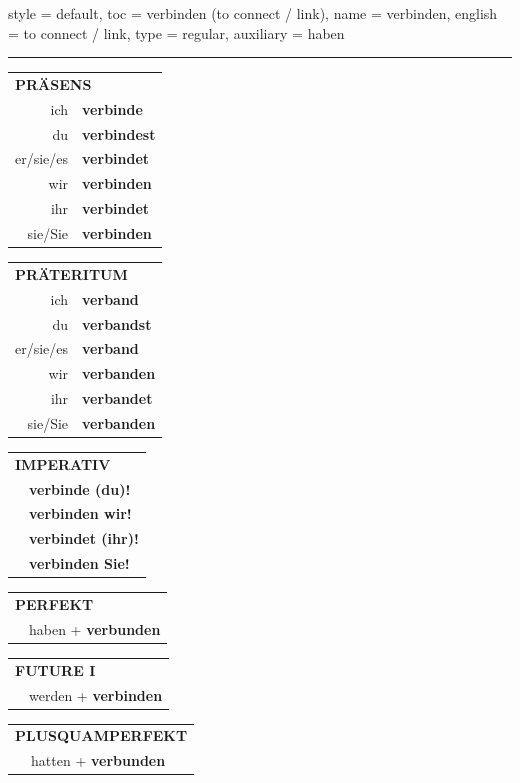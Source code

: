 \begin{verbentry}{
  style = {default},
  toc = {verbinden (to connect / link)},
  name = {verbinden},
  english = {to connect / link},
  type = {regular},
  auxiliary = {haben}
}


\vspace{5pt}
\hrule
\vspace{5pt}

\begin{tabular}{rl}
\multicolumn{2}{l}{\textbf{PRÄSENS}}\\
ich & \textbf{verbinde}\\
du & \textbf{verbindest}\\
er/sie/es & \textbf{verbindet}\\
wir & \textbf{verbinden}\\
ihr & \textbf{verbindet}\\
sie/Sie & \textbf{verbinden}\\
\end{tabular}
\hfill
\begin{tabular}{rl}
\multicolumn{2}{l}{\textbf{PRÄTERITUM}}\\
ich & \textbf{verband}\\
du & \textbf{verbandst}\\
er/sie/es & \textbf{verband}\\
wir & \textbf{verbanden}\\
ihr & \textbf{verbandet}\\
sie/Sie & \textbf{verbanden}\\
\end{tabular}
\hfill
\begin{tabular}{rl}
\multicolumn{2}{l}{\textbf{IMPERATIV}}\\
& \textbf{verbinde (du)!}\\
& \textbf{verbinden wir!}\\
& \textbf{verbindet (ihr)!}\\
& \textbf{verbinden Sie!}\\
\end{tabular}

\vspace{10pt}

\begin{tabular}{rl}
\multicolumn{2}{l}{\textbf{PERFEKT}}\\
& haben + \textbf{verbunden}\\
\end{tabular}
\hfill
\begin{tabular}{rl}
\multicolumn{2}{l}{\textbf{FUTURE I}}\\
& werden + \textbf{verbinden}\\
\end{tabular}
\hfill
\begin{tabular}{rl}
\multicolumn{2}{l}{\textbf{PLUSQUAMPERFEKT}}\\
& hatten + \textbf{verbunden}\\
\end{tabular}


\end{verbentry}

